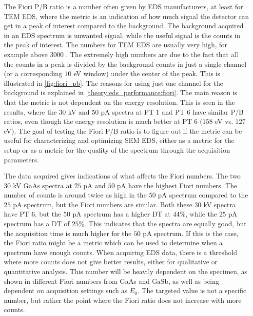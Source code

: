 The Fiori P/B ratio is a number often given by EDS manufacturers, at least for TEM EDS, where the metric is an indication of how much signal the detector can get in a peak of interest compared to the background.
The background acquired in an EDS spectrum is unwanted signal, while the useful signal is the counts in the peak of interest.
The numbers for TEM EDS are usually very high, for example above $3000$ \cite{bennett_egerton_1995,ted_pella_nio_tem_2019}.
The extremely high numbers are due to the fact that all the counts in a peak is divided by the background counts in just a single channel (or a corresponding $10$ eV window) under the center of the peak.
This is illustrated in \cref{fig:fiori_pb}.
The reasons for using just one channel for the background is explained in \cref{theory:eds_performance:fiori}.
The main reason is that the metric is not dependent on the energy resolution.
This is seen in the results, where the $30$ kV and $50$ pA spectra at PT $1$ and PT $6$ have similar P/B ratios, even though the energy resolution is much better at PT $6$ ($158$ eV vs. $127$ eV).
The goal of testing the Fiori P/B ratio is to figure out if the metric can be useful for characterizing and optimizing SEM EDS, either as a metric for the setup or as a metric for the quality of the spectrum through the acquisition parameters.


The data acquired gives indications of what affects the Fiori numbers.
The two $30$ kV GaAs spectra at $25$ pA and $50$ pA have the highest Fiori numbers.
The number of counts is around twice as high in the $50$ pA spectrum compared to the $25$ pA spectrum, but the Fiori numbers are similar.
Both these $30$ kV spectra have PT $6$, but the $50$ pA spectrum has a higher DT at $44$\%, while the $25$ pA spectrum has a DT of $25$\%.
This indicates that the spectra are equally good, but the acquisition time is much higher for the $50$ pA spectrum.
If this is the case, the Fiori ratio might be a metric which can be used to determine when a spectrum have enough counts.
When acquiring EDS data, there is a threshold where more counts does not give better results, either for qualitative or quantitative analysis.
This number will be heavily dependent on the specimen, as shown in different Fiori numbers from GaAs and GaSb, as well as being dependent on acquisition settings such as $E_0$.
The targeted value is not a specific number, but rather the point where the Fiori ratio does not increase with more counts.


